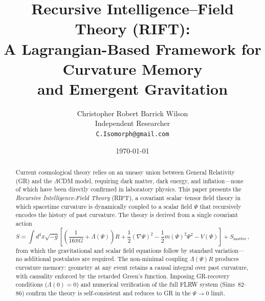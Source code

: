 \documentclass[12pt,a4paper]{article}
\begin{document}
\title{Recursive Intelligence--Field Theory (RIFT):\\
A Lagrangian-Based Framework for Curvature Memory\\
and Emergent Gravitation}

\author{Christopher Robert Barrick Wilson\\
\small Independent Researcher\\
\small \texttt{C.Isomorph@gmail.com}}

\date{\today}

\maketitle

\begin{abstract}
Current cosmological theory relies on an uneasy union between General
Relativity (GR) and the $\Lambda$CDM model, requiring dark matter, dark
energy, and inflation---none of which have been directly confirmed in
laboratory physics. This paper presents the \emph{Recursive
Intelligence-Field Theory} (RIFT), a covariant scalar--tensor field
theory in which spacetime curvature is dynamically coupled to a scalar
field $\Psi$ that recursively encodes the history of past curvature.
The theory is derived from a single covariant action
\begin{equation*}
S = \int d^4x\sqrt{-g}
\left[\left(\frac{1}{16\pi G}+\Lambda(\Psi)\right)R
+ \frac{1}{2}(\nabla\Psi)^2
- \frac{1}{2}m(\Psi)^2\Psi^2 - V(\Psi)\right] + S_{\mathrm{matter}}\,,
\end{equation*}
from which the gravitational and scalar field equations follow by
standard variation---no additional postulates are required. The
non-minimal coupling $\Lambda(\Psi)R$ produces curvature memory: geometry
at any event retains a causal integral over past curvature, with
causality enforced by the retarded Green's function. Imposing GR-recovery
conditions ($\Lambda(0)=0$) and numerical verification of the full FLRW
system (Sims~82--86) confirm the theory is self-consistent and reduces to
GR in the $\Psi\to 0$ limit.


\end{abstract}
\end{document}
